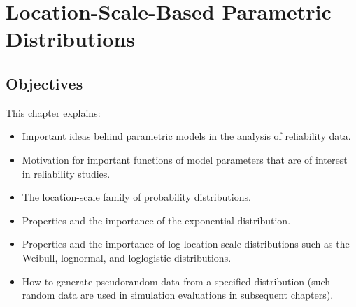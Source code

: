 
\setcounter{chapter}{3}

\chapter{Location-Scale-Based
Parametric Distributions}
\label{chapter:ls.parametric.models}




\section*{Objectives}
This chapter explains:
\begin{itemize} 
\item 
Important ideas behind parametric models in the analysis of
reliability data.
\item
Motivation for important functions of model parameters that are of
interest in reliability studies.
\item
The location-scale family of
probability distributions.
\item 
Properties and the importance of the exponential distribution.
\item 
Properties and the importance of log-location-scale
distributions such as the Weibull, lognormal, and
loglogistic distributions.
\item 
How to generate pseudorandom data from a specified distribution (such
random data are used in simulation evaluations in subsequent
chapters).
\end{itemize}

